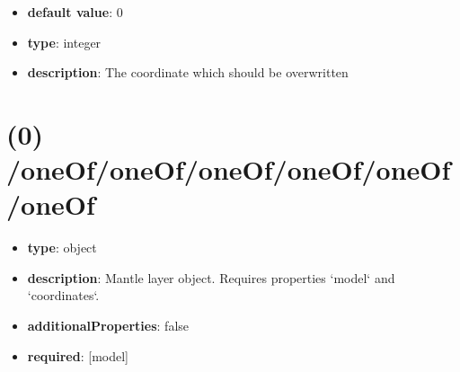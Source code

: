 \begin{itemize}[leftmargin=3em]\item {\bf default value}: 0
\item {\bf type}: integer
\item {\bf description}: The coordinate which should be overwritten
\end{itemize}\section{(0) /oneOf/oneOf/oneOf/oneOf/oneOf/oneOf}
\begin{itemize}[leftmargin=0em]\item {\bf type}: object
\item {\bf description}: Mantle layer object. Requires properties `model` and `coordinates`.
\item {\bf additionalProperties}: false
\item {\bf required}: [model]\end{itemize}
